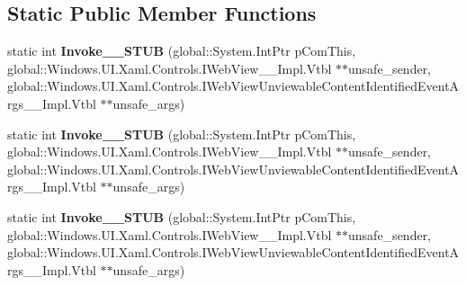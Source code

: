 \subsection*{Static Public Member Functions}
\begin{DoxyCompactItemize}
\item 
\mbox{\label{struct_windows_1_1_foundation_1_1_typed_event_handler___a___windows___u_i___xaml___controls___we525068a3adb52520cb6e4320f7738461_a9998a30b0206927bfb5834d0c00c5947}} 
static int {\bfseries Invoke\+\_\+\+\_\+\+S\+T\+UB} (global\+::\+System.\+Int\+Ptr p\+Com\+This, global\+::\+Windows.\+U\+I.\+Xaml.\+Controls.\+I\+Web\+View\+\_\+\+\_\+\+Impl.\+Vtbl $\ast$$\ast$unsafe\+\_\+sender, global\+::\+Windows.\+U\+I.\+Xaml.\+Controls.\+I\+Web\+View\+Unviewable\+Content\+Identified\+Event\+Args\+\_\+\+\_\+\+Impl.\+Vtbl $\ast$$\ast$unsafe\+\_\+args)
\item 
\mbox{\label{struct_windows_1_1_foundation_1_1_typed_event_handler___a___windows___u_i___xaml___controls___we525068a3adb52520cb6e4320f7738461_a9998a30b0206927bfb5834d0c00c5947}} 
static int {\bfseries Invoke\+\_\+\+\_\+\+S\+T\+UB} (global\+::\+System.\+Int\+Ptr p\+Com\+This, global\+::\+Windows.\+U\+I.\+Xaml.\+Controls.\+I\+Web\+View\+\_\+\+\_\+\+Impl.\+Vtbl $\ast$$\ast$unsafe\+\_\+sender, global\+::\+Windows.\+U\+I.\+Xaml.\+Controls.\+I\+Web\+View\+Unviewable\+Content\+Identified\+Event\+Args\+\_\+\+\_\+\+Impl.\+Vtbl $\ast$$\ast$unsafe\+\_\+args)
\item 
\mbox{\label{struct_windows_1_1_foundation_1_1_typed_event_handler___a___windows___u_i___xaml___controls___we525068a3adb52520cb6e4320f7738461_a9998a30b0206927bfb5834d0c00c5947}} 
static int {\bfseries Invoke\+\_\+\+\_\+\+S\+T\+UB} (global\+::\+System.\+Int\+Ptr p\+Com\+This, global\+::\+Windows.\+U\+I.\+Xaml.\+Controls.\+I\+Web\+View\+\_\+\+\_\+\+Impl.\+Vtbl $\ast$$\ast$unsafe\+\_\+sender, global\+::\+Windows.\+U\+I.\+Xaml.\+Controls.\+I\+Web\+View\+Unviewable\+Content\+Identified\+Event\+Args\+\_\+\+\_\+\+Impl.\+Vtbl $\ast$$\ast$unsafe\+\_\+args)

\end{DoxyCompactItemize}
